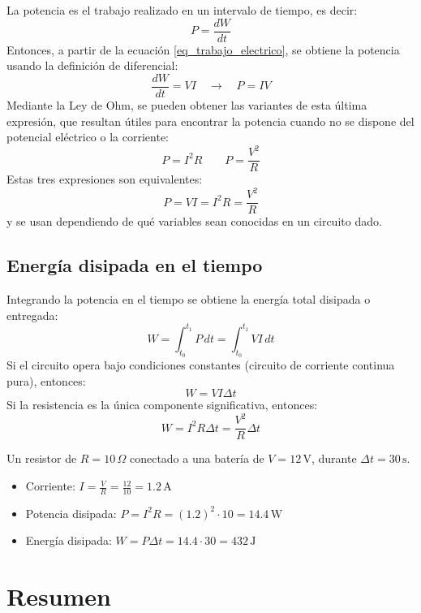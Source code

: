 La potencia es el trabajo realizado en un intervalo de tiempo, es decir:
\[
  P = \frac{dW}{dt}
\]
Entonces, a partir de la ecuación \eqref{eq_trabajo_electrico}, se obtiene la potencia usando la definición de diferencial:
\[
  \frac{dW}{dt} = VI \quad \rightarrow \quad \boxed{P=IV}
\]
Mediante la Ley de Ohm, se pueden obtener las variantes de esta última expresión, que resultan útiles para encontrar la potencia cuando no se dispone del potencial eléctrico o la corriente:
\[
  P=I^2R \qquad P=\frac{V^2}{R}
\]
Estas tres expresiones son equivalentes:
\begin{equation}
  \boxed{P = VI = I^2 R = \frac{V^2}{R}}
  \label{eq:potencia_electrica}
\end{equation}
y se usan dependiendo de qué variables sean conocidas en un circuito dado.

\subsection{Energía disipada en el tiempo}

Integrando la potencia en el tiempo se obtiene la energía total disipada o entregada:
\[
  W = \int_{t_0}^{t_1} P \, dt = \int_{t_0}^{t_1} VI \, dt
\]
Si el circuito opera bajo condiciones constantes (circuito de corriente continua pura), entonces:
\[
  W = V I \Delta t
\]
Si la resistencia es la única componente significativa, entonces:
\[
  W = I^2 R \Delta t = \frac{V^2}{R} \Delta t
\]

\begin{example}
  Un resistor de \( R = 10 \, \Omega \) conectado a una batería de \( V = 12 \, \text{V} \), durante \( \Delta t = 30 \, \text{s} \).
  \begin{itemize}
    \item Corriente: \( I = \frac{V}{R} = \frac{12}{10} = 1.2 \, \text{A} \)
    \item Potencia disipada: \( P = I^2 R = (1.2)^2 \cdot 10 = 14.4 \, \text{W} \)
    \item Energía disipada: \( W = P \Delta t = 14.4 \cdot 30 = 432 \, \text{J} \)
  \end{itemize}
\end{example}

\section{Resumen}

